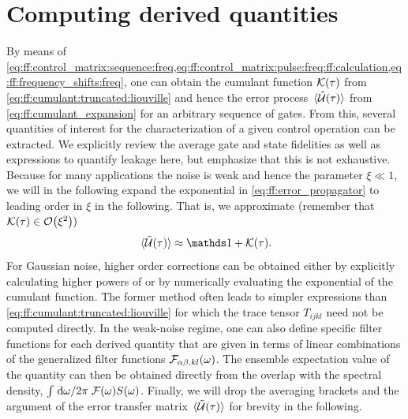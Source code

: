 \section{Computing derived quantities}\label{sec:ff:theory:derived_quantities}
By means of \cref{eq:ff:control_matrix:sequence:freq,eq:ff:control_matrix:pulse:freq:ff:calculation,eq:ff:frequency_shifts:freq}, one can obtain the cumulant function $\mathcal{K}(\tau)$ from \cref{eq:ff:cumulant:truncated:liouville} and hence the error process $\expval*{\mathcal{\tilde{U}}(\tau)}$ from \cref{eq:ff:cumulant_expansion} for an arbitrary sequence of gates.
From this, several quantities of interest for the characterization of a given control operation can be extracted.
We explicitly review the average gate and state fidelities as well as expressions to quantify leakage here, but emphasize that this is not exhaustive.
Because for many applications the noise is weak and hence the parameter $\xi\ll 1$, we will in the following expand the exponential in \cref{eq:ff:error_propagator} to leading order in $\xi$ in the following.
That is, we approximate (remember that $\cumulantfun(\tau)\in\order{\xi^2})$
\begin{equation}\label{eq:ff:error_transfer_matrix:approx}
    \ev*{\liouvUe(\tau)}\approx\eye + \cumulantfun(\tau).
\end{equation}
For Gaussian noise, higher order corrections can be obtained either by explicitly calculating higher powers of \cumulantfun or by numerically evaluating the exponential of the cumulant function.
The former method often leads to simpler expressions than \cref{eq:ff:cumulant:truncated:liouville} for which the trace tensor $T_{ijkl}$ need not be computed directly.
In the weak-noise regime, one can also define specific filter functions for each derived quantity that are given in terms of linear combinations of the generalized filter functions $\mathcal{F}_{\alpha\beta,kl}(\omega)$.
The ensemble expectation value of the quantity can then be obtained directly from the overlap with the spectral density, $\int\flatfrac{\dd{\omega}}{2\pi} \FF(\omega) S(\omega)$.
Finally, we will drop the averaging brackets and the argument of the error transfer matrix $\ev*{\liouvUe(\tau)}$ for brevity in the following.

